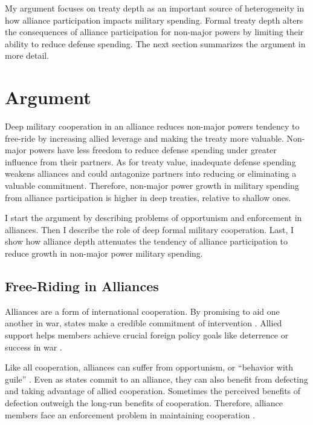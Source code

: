 \documentclass[12pt]{article}
\begin{document}
My argument focuses on treaty depth as an important source of heterogeneity in how alliance participation impacts military spending. 
Formal treaty depth alters the consequences of alliance participation for non-major powers by limiting their ability to reduce defense spending. 
The next section summarizes the argument in more detail. 



\section{Argument}

Deep military cooperation in an alliance reduces non-major powers tendency to free-ride by increasing allied leverage and making the treaty more valuable. 
Non-major powers have less freedom to reduce defense spending under greater influence from their partners. 
As for treaty value, inadequate defense spending weakens alliances and could antagonize partners into reducing or eliminating a valuable commitment. 
Therefore, non-major power growth in military spending from alliance participation is higher in deep treaties, relative to shallow ones. 


I start the argument by describing problems of opportunism and enforcement in alliances. 
Then I describe the role of deep formal military cooperation. 
Last, I show how alliance depth attenuates the tendency of alliance participation to reduce growth in non-major power military spending. 


\subsection{Free-Riding in Alliances}

Alliances are a form of international cooperation. 
By promising to aid one another in war, states make a credible commitment of intervention \citep{Fearon1997, Morrow2000}. 
Allied support helps members achieve crucial foreign policy goals like deterrence or success in war \citep{Walt1990, Snyder1997}. 


Like all cooperation, alliances can suffer from opportunism, or ``behavior with guile'' \citep{Williamson1985}. 
Even as states commit to an alliance, they can also benefit from defecting and taking advantage of allied cooperation. 
Sometimes the perceived benefits of defection outweigh the long-run benefits of cooperation. 
Therefore, alliance members face an enforcement problem in maintaining cooperation \citep{Fearon1998a, Koremenosetal2001}.
\end{document}
